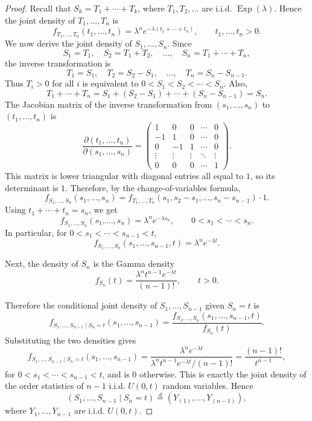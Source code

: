 \documentclass[11pt]{article}
\theoremstyle{plain}
\theoremstyle{definition}
\theoremstyle{remark}
\begin{document}
\begin{proof}
	Recall that \(S_k=T_1+\cdots+T_k\), where \(T_1,T_2,\dots\) are i.i.d. \(\operatorname{Exp}(\lambda)\). Hence the joint density of \(T_1,\dots,T_n\) is
	\[
	f_{T_1,\dots,T_n}(t_1,\dots,t_n)
	=
	\lambda^n e^{-\lambda(t_1+\cdots+t_n)},
	\qquad t_1,\dots,t_n>0.
	\]
	We now derive the joint density of \(S_1,\dots,S_n\). Since
	\[
	S_1=T_1,\quad S_2=T_1+T_2,\quad \dots,\quad S_n=T_1+\cdots+T_n,
	\]
	the inverse transformation is
	\[
	T_1=S_1,\quad T_2=S_2-S_1,\quad \dots,\quad T_n=S_n-S_{n-1}.
	\]
	Thus \(T_i>0\) for all \(i\) is equivalent to \(0<S_1<S_2<\cdots<S_n\). Also,
	\[
	T_1+\cdots+T_n
	=
	S_1+(S_2-S_1)+\cdots+(S_n-S_{n-1})
	=
	S_n.
	\]
	The Jacobian matrix of the inverse transformation from \((s_1,\dots,s_n)\) to \((t_1,\dots,t_n)\) is
	\[
	\frac{\partial(t_1,\dots,t_n)}{\partial(s_1,\dots,s_n)}
	=
	\begin{pmatrix}
		1 & 0 & 0 & \cdots & 0 \\
		-1 & 1 & 0 & \cdots & 0 \\
		0 & -1 & 1 & \cdots & 0 \\
		\vdots & \vdots & \vdots & \ddots & \vdots \\
		0 & 0 & 0 & \cdots & 1
	\end{pmatrix}.
	\]
	This matrix is lower triangular with diagonal entries all equal to \(1\), so its determinant is \(1\). Therefore, by the change-of-variables formula,
	\[
	f_{S_1,\dots,S_n}(s_1,\dots,s_n)
	=
	f_{T_1,\dots,T_n}(s_1,s_2-s_1,\dots,s_n-s_{n-1})
	\cdot 1.
	\]
	Using \(t_1+\cdots+t_n=s_n\), we get
	\[
	f_{S_1,\dots,S_n}(s_1,\dots,s_n)
	=
	\lambda^n e^{-\lambda s_n},
	\qquad 0<s_1<\cdots<s_n.
	\]
	In particular, for \(0<s_1<\cdots<s_{n-1}<t\),
	\[
	f_{S_1,\dots,S_n}(s_1,\dots,s_{n-1},t)
	=
	\lambda^n e^{-\lambda t}.
	\]
	
	Next, the density of \(S_n\) is the Gamma density
	\[
	f_{S_n}(t)
	=
	\frac{\lambda^n t^{n-1}e^{-\lambda t}}{(n-1)!},
	\qquad t>0.
	\]
	
	Therefore the conditional joint density of \(S_1,\dots,S_{n-1}\) given \(S_n=t\) is
	\[
	f_{S_1,\dots,S_{n-1}\mid S_n=t}(s_1,\dots,s_{n-1})
	=
	\frac{
		f_{S_1,\dots,S_n}(s_1,\dots,s_{n-1},t)
	}{
		f_{S_n}(t)
	}.
	\]
	Substituting the two densities gives
	\[
	f_{S_1,\dots,S_{n-1}\mid S_n=t}(s_1,\dots,s_{n-1})
	=
	\frac{\lambda^n e^{-\lambda t}}
	{\lambda^n t^{n-1}e^{-\lambda t}/(n-1)!}
	=
	\frac{(n-1)!}{t^{n-1}},
	\]
	for \(0<s_1<\cdots<s_{n-1}<t\), and is \(0\) otherwise. This is exactly the joint density of the order statistics of \(n-1\) i.i.d. \(U(0,t)\) random variables. Hence
	\[
	(S_1,\dots,S_{n-1}\mid S_n=t)
	\overset{d}{=}
	(Y_{(1)},\dots,Y_{(n-1)}),
	\]
	where \(Y_1,\dots,Y_{n-1}\) are i.i.d. \(U(0,t)\).
\end{proof}
\end{document}
